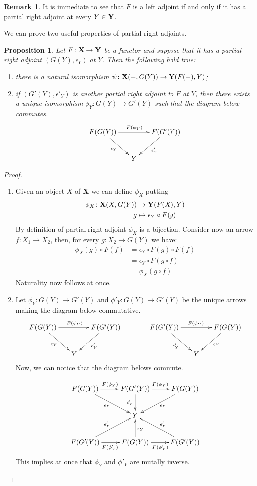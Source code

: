 \documentclass[a4paper]{article}
\def\X{\textbf {\textup{X}}}
\def\Y{\textbf {\textup{Y}}}
\newtheorem{proposition}[theorem]{Proposition}
\theoremstyle{definition}
\newtheorem{remark}[theorem]{Remark}
\begin{document}
\begin{remark}
	It is immediate to see that $F$ is a left adjoint if and only if it has a partial right adjoint at every $Y\in \Y$.
\end{remark}

We can prove two  useful properties of partial right adjoints.

\begin{proposition}\label{prop:uni}
	Let $F\colon \X\to \Y$ be a functor and suppose that it has a partial right adjoint $(G(Y), \epsilon_Y)$ at $Y$. Then the following hold true:
	\begin{enumerate}
\item there is a natural isomorphism $\psi\colon \X(-, G(Y))\to \Y(F(-), Y)$;
\item if $(G'(Y), \epsilon'_Y)$ is another partial right adjoint to $F$ at $Y$, then there exists a unique isomorphism $\phi_Y\colon G(Y)\to G'(Y)$ such that the diagram below commutes.
\[\xymatrix@C=15pt{F(G(Y)) \ar[rr]^{F(\phi_Y)} \ar[dr]_{\epsilon_Y} & &F(G'(Y)) \ar[dl]^{\epsilon'_Y}\\ & Y}\]
	\end{enumerate}
\end{proposition}
\begin{proof}
	\begin{enumerate}
		\item Given an object $X$ of $\X$ we can define $\phi_X$ putting
		\begin{align*}
			\phi_X \colon \X(X, G(Y))&\to \Y(F(X), Y)\\
			g&\mapsto \epsilon_Y\circ F(g)
		\end{align*}
		By definition of partial right adjoint $\phi_X$ is a bijection. Consider now an arrow $f\colon X_1\to X_2$, then, for every $g\colon X_2\to G(Y)$ we have:
		\begin{align*}
			\phi_X(g)\circ F(f)&=\epsilon_Y\circ F(g)\circ F(f)\\&= \epsilon_Y\circ F(g\circ f)\\&=\phi_X(g\circ f)
		\end{align*}
		Naturality now follows at once.
		
		\item Let $\phi_Y\colon G(Y)\to G'(Y)$ and $\phi'_Y\colon G(Y)\to G'(Y)$ be the unique arrows making the diagram below commutative.
\[\xymatrix@C=15pt{F(G(Y)) \ar[rr]^{F(\phi_Y)} \ar[dr]_{\epsilon_Y} & &F(G'(Y)) \ar[dl]^{\epsilon'_Y} && F(G'(Y)) \ar[rr]^{F(\phi_Y)} \ar[dr]_{\epsilon'_Y} & &F(G(Y)) \ar[dl]^{\epsilon_Y}\\ & Y &&&&Y}\]
		Now, we can notice that the diagram belows commute.
	
	\[\xymatrix{F(G(Y)) \ar[r]^{F(\phi_Y)} \ar[dr]_{\epsilon_Y} &F(G'(Y)) \ar[r]^{F(\phi_Y)} \ar[d]_{\epsilon'_Y} & F(G(Y)) \ar[dl]^{\epsilon_Y} \\ & Y \\ F(G'(Y)) \ar[r]_{F(\phi'_Y)} \ar[ur]^{\epsilon'_Y} &F(G(Y)) \ar[r]_{F(\phi'_Y)} \ar[u]_{\epsilon_Y} & F(G'(Y)) \ar[ul]_{\epsilon'_Y}}\]	
This implies at once that $\phi_Y$ and $\phi'_Y$ are mutally inverse. \qedhere 
	\end{enumerate}
	
\end{proof}
\end{document}
